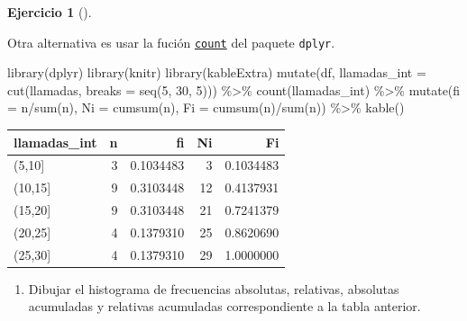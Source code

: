 \documentclass[
  a4paper,
]{scrreport}
\newenvironment{Shaded}{\begin{snugshade}}{\end{snugshade}}
\newcommand{\AttributeTok}[1]{\textcolor[rgb]{0.40,0.45,0.13}{#1}}
\newcommand{\DecValTok}[1]{\textcolor[rgb]{0.68,0.00,0.00}{#1}}
\newcommand{\FunctionTok}[1]{\textcolor[rgb]{0.28,0.35,0.67}{#1}}
\newcommand{\NormalTok}[1]{\textcolor[rgb]{0.00,0.23,0.31}{#1}}
\newcommand{\SpecialCharTok}[1]{\textcolor[rgb]{0.37,0.37,0.37}{#1}}
\providecommand{\tightlist}{%
  \setlength{\itemsep}{0pt}\setlength{\parskip}{0pt}}\usepackage{longtable,booktabs,array}
\theoremstyle{definition}
\newtheorem{exercise}{Ejercicio}[chapter]
\theoremstyle{remark}
\begin{document}
\begin{exercise}[]
\begin{tcolorbox}
Otra alternativa es usar la fución
\href{https://aprendeconalf.es/manual-r/06-preprocesamiento.html\#conteo-del-n\%C3\%BAmero-de-observaciones}{\texttt{count}}
del paquete \texttt{dplyr}.

\begin{Shaded}
\begin{Highlighting}[]
\FunctionTok{library}\NormalTok{(dplyr)}
\FunctionTok{library}\NormalTok{(knitr)}
\FunctionTok{library}\NormalTok{(kableExtra)}
\FunctionTok{mutate}\NormalTok{(df, }\AttributeTok{llamadas\_int =} \FunctionTok{cut}\NormalTok{(llamadas, }\AttributeTok{breaks =} \FunctionTok{seq}\NormalTok{(}\DecValTok{5}\NormalTok{, }\DecValTok{30}\NormalTok{, }\DecValTok{5}\NormalTok{))) }\SpecialCharTok{\%\textgreater{}\%} 
    \FunctionTok{count}\NormalTok{(llamadas\_int) }\SpecialCharTok{\%\textgreater{}\%}
    \FunctionTok{mutate}\NormalTok{(}\AttributeTok{fi =}\NormalTok{ n}\SpecialCharTok{/}\FunctionTok{sum}\NormalTok{(n), }\AttributeTok{Ni =} \FunctionTok{cumsum}\NormalTok{(n), }\AttributeTok{Fi =} \FunctionTok{cumsum}\NormalTok{(n)}\SpecialCharTok{/}\FunctionTok{sum}\NormalTok{(n)) }\SpecialCharTok{\%\textgreater{}\%}
    \FunctionTok{kable}\NormalTok{()}
\end{Highlighting}
\end{Shaded}

\begin{tabular}{l|r|r|r|r}
\hline
llamadas\_int & n & fi & Ni & Fi\\
\hline
(5,10] & 3 & 0.1034483 & 3 & 0.1034483\\
\hline
(10,15] & 9 & 0.3103448 & 12 & 0.4137931\\
\hline
(15,20] & 9 & 0.3103448 & 21 & 0.7241379\\
\hline
(20,25] & 4 & 0.1379310 & 25 & 0.8620690\\
\hline
(25,30] & 4 & 0.1379310 & 29 & 1.0000000\\
\hline
\end{tabular}

\end{tcolorbox}

\begin{enumerate}
\def\labelenumi{\alph{enumi}.}
\setcounter{enumi}{3}
\tightlist
\item
  Dibujar el histograma de frecuencias absolutas, relativas, absolutas
  acumuladas y relativas acumuladas correspondiente a la tabla anterior.
\end{enumerate}

\begin{tcolorbox}[enhanced jigsaw, coltitle=black, breakable, bottomtitle=1mm, colbacktitle=quarto-callout-tip-color!10!white, rightrule=.15mm, opacityback=0, opacitybacktitle=0.6, left=2mm, colframe=quarto-callout-tip-color-frame, title=\textcolor{quarto-callout-tip-color}{\faLightbulb}\hspace{0.5em}{Solución 1}, toprule=.15mm, toptitle=1mm, arc=.35mm, colback=white, titlerule=0mm, bottomrule=.15mm, leftrule=.75mm]


\end{tcolorbox}
\end{exercise}
\end{document}
